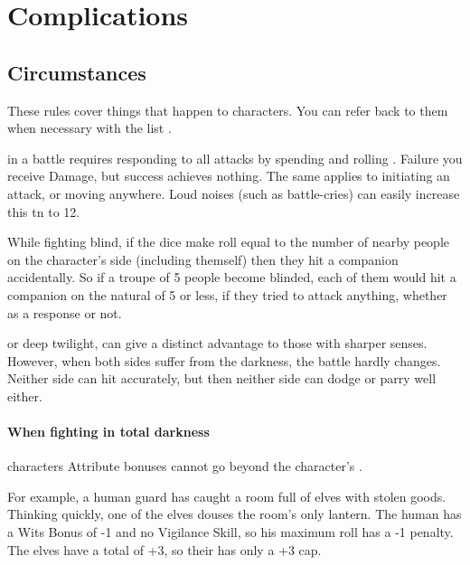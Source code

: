 \projectilesChart

\startcontents[Manoeuvres]

\section{Complications}

\begin{multicols}{2}

\subsection{Circumstances}

These rules cover things that happen to characters.
You can refer back to them when necessary with the list .

in a battle requires responding to all attacks by spending  and rolling .
Failure you receive Damage, but success achieves nothing.
The same applies to initiating an attack, or moving anywhere.
Loud noises (such as battle-cries) can easily increase this \gls{tn} to 12.

While fighting blind, if the dice make  roll equal to the number of nearby people on the character's side (including themself) then they hit a companion accidentally.
So if a troupe of 5 people become blinded, each of them would hit a companion on the \gls{natural} of 5 or less, if they tried to attack anything, whether as a response or not.

\label{darkness}
or deep twilight, can give a distinct advantage to those with sharper senses.
However, when both sides suffer from the darkness, the battle hardly changes.
Neither side can hit accurately, but then neither side can dodge or parry well either.

\paragraph*{When fighting in total darkness}
characters Attribute bonuses cannot go beyond the character's .

\begin{exampletext}
  For example, a human guard has caught a room full of elves with stolen goods.
  Thinking quickly, one of the elves douses the room's only lantern.
  The human has a Wits Bonus of -1 and no Vigilance Skill, so his maximum roll has a -1 penalty.
  The elves have a total  of +3, so their  has only a +3 cap.
\end{exampletext}


\end{multicols}
